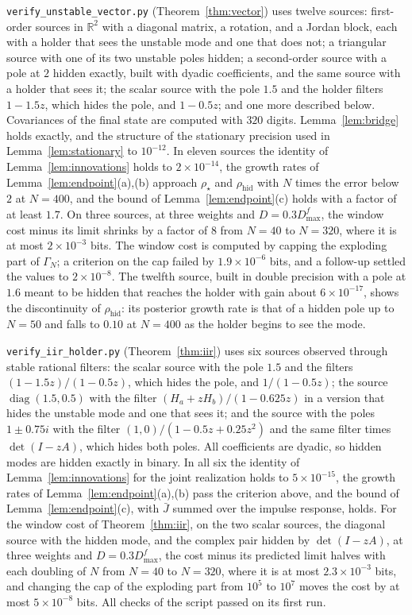 \documentclass[11pt,onecolumn]{IEEEtran}
\newcommand{\R}{\mathbb{R}}
\newcommand{\rhid}{\rho_{\mathrm{hid}}}
\begin{document}
\texttt{verify\_unstable\_vector.py} (Theorem~\ref{thm:vector}) uses
twelve sources: first-order sources in $\R^2$ with a diagonal matrix, a
rotation, and a Jordan block, each with a holder that sees the unstable
mode and one that does not; a triangular source with one of its two
unstable poles hidden; a second-order source with a pole at $2$ hidden
exactly, built with dyadic coefficients, and the same source with a
holder that sees it; the scalar source with the pole $1.5$ and the
holder filters $1-1.5z$, which hides the pole, and $1-0.5z$; and one more
described below. Covariances of the final state are computed with
$320$ digits. Lemma~\ref{lem:bridge} holds exactly, and the structure of
the stationary precision used in Lemma~\ref{lem:stationary} to
$10^{-12}$. In eleven sources the identity of
Lemma~\ref{lem:innovations} holds to $2\times10^{-14}$, the growth rates of
Lemma~\ref{lem:endpoint}(a),(b) approach $\rho_\star$ and $\rhid$ with $N$
times the error below $2$ at $N=400$, and the bound of
Lemma~\ref{lem:endpoint}(c) holds with a factor of at least $1.7$. On
three sources, at three weights and $D=0.3D_{\max}^f$, the window cost
minus its limit shrinks by a factor of $8$ from $N=40$ to $N=320$, where
it is at most $2\times10^{-3}$ bits. The window cost is computed by capping
the exploding part of $\Gamma_N$; a criterion on the cap failed by
$1.9\times10^{-6}$ bits, and a follow-up settled the values to
$2\times10^{-8}$. The twelfth source, built in double precision with a pole
at $1.6$ meant to be hidden that reaches the holder with gain about
$6\times10^{-17}$, shows the discontinuity of $\rhid$: its posterior growth
rate is that of a hidden pole up to $N=50$ and falls to $0.10$ at
$N=400$ as the holder begins to see the mode.

\texttt{verify\_iir\_holder.py} (Theorem~\ref{thm:iir}) uses six sources
observed through stable rational filters: the scalar source with the
pole $1.5$ and the filters $(1-1.5z)/(1-0.5z)$, which hides the pole, and
$1/(1-0.5z)$; the source $\operatorname{diag}(1.5,0.5)$ with the filter
$(H_a+zH_b)/(1-0.625z)$ in a version that hides the unstable mode and one
that sees it; and the source with the poles $1\pm0.75i$ with the filter
$(1,0)/(1-0.5z+0.25z^2)$ and the same filter times $\det(I-zA)$, which
hides both poles. All coefficients are dyadic, so hidden modes are
hidden exactly in binary. In all six the identity of
Lemma~\ref{lem:innovations} for the joint realization holds to
$5\times10^{-15}$, the growth rates of Lemma~\ref{lem:endpoint}(a),(b) pass
the criterion above, and the bound of Lemma~\ref{lem:endpoint}(c), with
$\bar J$ summed over the impulse response, holds. For the window cost of
Theorem~\ref{thm:iir}, on the two scalar sources, the diagonal source with
the hidden mode, and the complex pair hidden by $\det(I-zA)$, at three
weights and $D=0.3D_{\max}^f$, the cost minus its predicted limit halves
with each doubling of $N$ from $N=40$ to $N=320$, where it is at most
$2.3\times10^{-3}$ bits, and changing the cap of the exploding part from
$10^5$ to $10^7$ moves the cost by at most $5\times10^{-8}$ bits. All checks of
the script passed on its first run.
\end{document}
